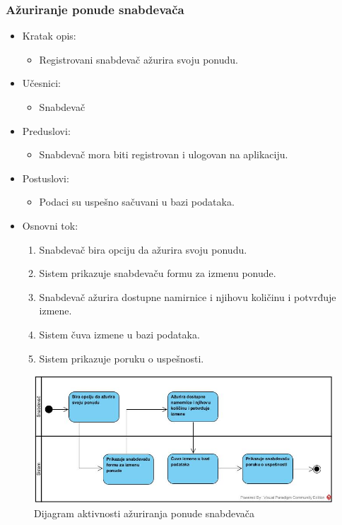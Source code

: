 \subsubsection{Ažuriranje ponude snabdevača}

\begin{itemize}
    \item Kratak opis:
        \begin{itemize}
            \item Registrovani snabdevač ažurira svoju ponudu.
        \end{itemize}
    \item Učesnici:
        \begin{itemize}
            \item Snabdevač
        \end{itemize}
    \item Preduslovi:
        \begin{itemize}
            \item Snabdevač mora biti registrovan i ulogovan na aplikaciju.
        \end{itemize}
    \item Postuslovi:
        \begin{itemize}
            \item Podaci su uspešno sačuvani u bazi podataka.
        \end{itemize}
    \item Osnovni tok:
        \begin{enumerate}
            \item Snabdevač bira opciju da ažurira svoju ponudu.
            \item Sistem prikazuje snabdevaču formu za izmenu ponude.
            \item Snabdevač ažurira dostupne namirnice i njihovu količinu i potvrđuje izmene.
            \item Sistem čuva izmene u bazi podataka.
            \item Sistem prikazuje poruku o uspešnosti. 
        \end{enumerate}
\end{itemize}


\begin{figure}[H]
\begin{center}
\includegraphics[width=\textwidth]{Pictures/activity_update_supplier_account.jpg}
\end{center}
    \caption{Dijagram aktivnosti ažuriranja ponude snabdevača}
\label{fig:ActivityUpdateSupplierAccount}
\end{figure}
